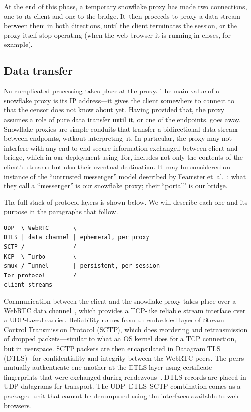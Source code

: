 \documentclass[letterpaper,twocolumn]{article}
\begin{document}
At the end of this phase,
a temporary snowflake proxy has made two connections,
one to its client and one to the bridge.
It~then proceeds to proxy a data stream between them
in both directions,
until the client terminates the session,
or the proxy itself stop operating
(when the web browser it is running in closes, for example).

\subsection{Data transfer}
\label{sec:data-transfer}

No complicated processing takes place at the proxy.
The main value of a snowflake proxy is its IP address---it
gives the client somewhere to connect to that the censor does not know about yet.
Having provided that, the proxy assumes a role
of pure data transfer until it, or one of the endpoints, goes away.
Snowflake proxies are simple conduits that transfer
a bidirectional data stream between endpoints,
without interpreting~it.
In particular, the proxy may not interfere with any
end-to-end secure information exchanged between client and bridge,
which in our deployment using Tor,
includes not only the contents of the client's streams
but also their eventual destination.
It~may be considered an instance of the
``untrusted messenger'' model described by
Feamster et~al.~\cite[\S 3]{Feamster2003a}:
what they call a ``messenger'' is our snowflake proxy;
their ``portal'' is our bridge.

The full stack of protocol layers is shown below.
We will describe each one and its purpose
in the paragraphs that follow.

\begin{verbatim}
UDP  \ WebRTC       \
DTLS | data channel | ephemeral, per proxy
SCTP /              /
KCP  \ Turbo        \
smux / Tunnel       | persistent, per session
Tor protocol        /
client streams
\end{verbatim}

Communication between the client and the snowflake proxy
takes place over
a WebRTC data channel~\cite{rfc8831}, which
provides a TCP-like
reliable stream interface over a UDP-based carrier.
Reliability comes from an embedded layer of
Stream Control Transmission Protocol (SCTP), which
does reordering and retransmission of dropped packets---similar
to what an OS kernel does for a TCP connection,
but in userspace.
SCTP packets are then encapsulated in Datagram TLS (DTLS)~\cite{rfc9147}
for confidentiality and integrity between the WebRTC peers.
The peers mutually authenticate one another
at the DTLS layer using certificate fingerprints
that were exchanged during rendezvous~\cite[\S 5.1]{rfc8842}.
DTLS records are placed in UDP datagrams for transport.
The UDP--DTLS--SCTP combination comes as a packaged unit
that cannot be decomposed using the interfaces available to web browsers.
\end{document}
